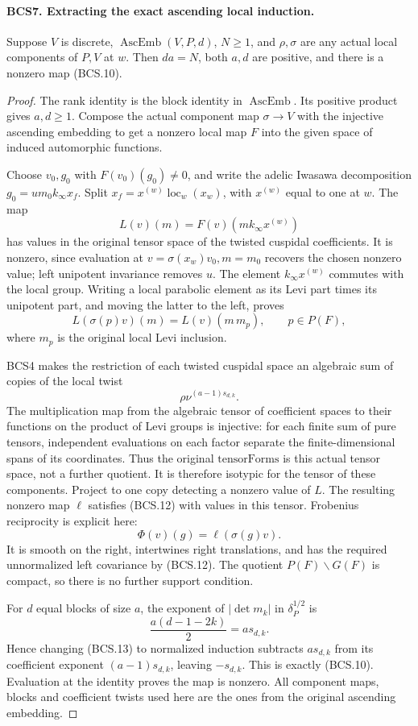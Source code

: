 \documentclass[11pt,a4paper]{article}
\numberwithin{equation}{section}
\theoremstyle{remark}\newtheorem{remark}[theorem]{Remark}
\begin{document}
\paragraph{BCS7. Extracting the exact ascending local induction.}
\label{claim:BCS7}
\leavevmode\par
Suppose \(V\) is discrete, \(\operatorname{AscEmb}(V,P,d)\),
\(N\ge1\), and \(\rho,\sigma\) are any actual local
components of \(P,V\) at \(w\).  Then \(da=N\), both
\(a,d\) are positive, and there is a nonzero map (BCS.10).
\begin{proof}
The rank identity is the block identity in \(\operatorname{AscEmb}\).
Its positive product gives \(a,d\ge1\).  Compose the actual
component map \(\sigma\to V\) with the injective ascending
embedding to get a nonzero local map \(F\) into the given space
of induced automorphic functions.

Choose \(v_0,g_0\) with \(F(v_0)(g_0)\ne0\), and write the
adelic Iwasawa decomposition
\(g_0=u m_0 k_\infty x_f\).  Split
\(x_f=x^{(w)}\operatorname{loc}_w(x_w)\), with
\(x^{(w)}\) equal to one at \(w\).  The map
\[
 L(v)(m)=F(v)(m k_\infty x^{(w)})
 \tag{BCS.11}
\]
has values in the original tensor space of the twisted cuspidal
coefficients.  It is nonzero, since evaluation at
\(v=\sigma(x_w)v_0,m=m_0\) recovers the chosen nonzero value;
left unipotent invariance removes \(u\).  The element
\(k_\infty x^{(w)}\) commutes with the local group.  Writing a
local parabolic element as its Levi part times its unipotent part,
and moving the latter to the left, proves
\[
 L(\sigma(p)v)(m)=L(v)(m\,m_p),\qquad p\in P(F),
 \tag{BCS.12}
\]
where \(m_p\) is the original local Levi inclusion.

BCS4 makes the restriction of each twisted cuspidal space an
algebraic sum of copies of the local twist
\[
                         \rho\nu^{(a-1)s_{d,k}}.
\]
The multiplication map from the algebraic tensor of coefficient
spaces to their functions on the product of Levi groups is injective:
for each finite sum of pure tensors, independent evaluations on each
factor separate the finite-dimensional spans of its coordinates.
Thus the original \(\mathrm{tensorForms}\) is this actual tensor
space, not a further quotient.  It is therefore
isotypic for the tensor of these components.  Project to one copy
detecting a nonzero value of \(L\).  The resulting nonzero map
\(\ell\) satisfies (BCS.12) with values in this tensor.
Frobenius reciprocity is explicit here:
\[
                   \Phi(v)(g)=\ell(\sigma(g)v).
 \tag{BCS.13}
\]
It is smooth on the right, intertwines right translations, and has
the required unnormalized left covariance by (BCS.12).  The quotient
\(P(F)\backslash G(F)\) is compact, so there is no further
support condition.

For \(d\) equal blocks of size \(a\), the exponent of
\(|\det m_k|\) in \(\delta_P^{1/2}\) is
\[
 \frac{a(d-1-2k)}2=a s_{d,k}.
 \tag{BCS.14}
\]
Hence changing (BCS.13) to normalized induction subtracts
\(a s_{d,k}\) from its coefficient exponent
\((a-1)s_{d,k}\), leaving \(-s_{d,k}\).  This is exactly
(BCS.10).  Evaluation at the identity proves the map is nonzero.
All component maps, blocks and coefficient twists used here are the
ones from the original ascending embedding.
\end{proof}
\end{document}
